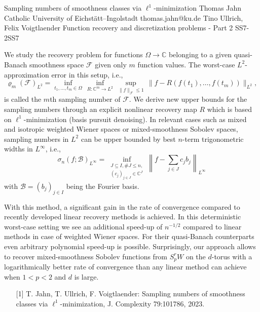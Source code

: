 \begin{talk}
  {Sampling numbers of smoothness classes via $\ell^1$-minimization}%
  {Thomas Jahn}%
  {Catholic University of Eichstätt--Ingolstadt}%
  {thomas.jahn@ku.de}%
  {Tino Ullrich, Felix Voigtlaender}%
{Function recovery and discretization problems - Part 2}
{}{SS7-2}{SS7}


				
We study the recovery problem for functions $\Omega\to\mathbb{C}$ belonging to a given quasi-Banach smoothness space $\mathcal{F}$ given only $m$ function values.
The worst-case $L^2$-approximation error in this setup, i.e.,
$$
  \varrho_m (\mathcal{F})_{L^2}
  = \inf_{t_1,\ldots,t_m \in \Omega}\,
       \inf_{R : \mathbb{C}^m \to L^2}\,
         \sup_{\|f\|_{\mathcal{F}} \leq 1}\,
           \|f - R(f(t_1),\ldots,f(t_m))\|_{L^2},
$$
is called the $m$th sampling number of $\mathcal{F}$.
We derive new upper bounds for the sampling numbers through an explicit nonlinear recovery map $R$ which is based on $\ell^1$-minimization (basis pursuit denoising).
In relevant cases such as mixed and isotropic weighted Wiener spaces or mixed-smoothness Sobolev spaces, sampling numbers in $L^2$ can be upper bounded by best $n$-term trigonometric widths in $L^\infty$, i.e.,
$$
  \sigma_n (f; \mathcal{B})_{L^\infty}
  = \inf_{\substack{J \subseteq I, \#J \leq n,\\ (c_j)_{j \in J} \in \mathbb{C}^J}}\left\|f - \sum_{j \in J}c_jb_j\right\|_{L^\infty}
$$
with $\mathcal{B}=(b_j)_{j\in I}$ being the Fourier basis.

With this method, a significant gain in the rate of convergence compared to recently developed linear recovery methods is achieved. 
In this deterministic worst-case setting we see an additional speed-up of $n^{-1/2}$ compared to linear methods in case of weighted Wiener spaces.
For their quasi-Banach counterparts even arbitrary polynomial speed-up is possible.
Surprisingly, our approach allows to recover mixed-smoothness Sobolev functions from $S_p^rW$ on the $d$-torus with a logarithmically better rate of convergence than any linear method can achieve when $1<p<2$ and $d$ is large.\

\medskip

\begin{itemize}
\item[{[1]}]{T. Jahn, T. Ullrich, F. Voigtlaender: Sampling numbers of smoothness classes via $\ell^1$-minimization, J. Complexity 79:101786, 2023.}
\end{itemize}
\end{talk}

